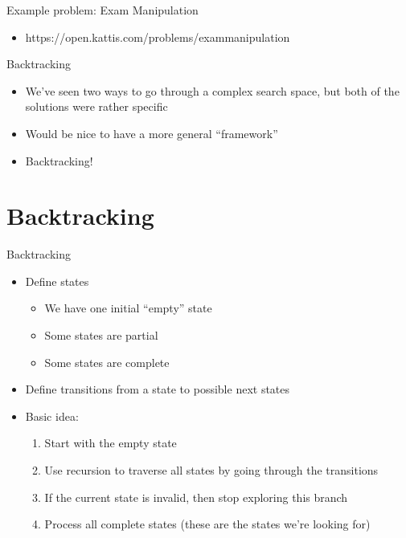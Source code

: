 \documentclass{beamer}
\begin{document}
\begin{frame}[plain]{Example problem: Exam Manipulation}
    \begin{itemize}
        \item https://open.kattis.com/problems/exammanipulation
    \end{itemize}
\end{frame}

\begin{frame}{Backtracking}
    \begin{itemize}
        \item We've seen two ways to go through a complex search space, but both of the solutions were rather specific
        \item Would be nice to have a more general ``framework''
        \vspace{10pt}
        \item Backtracking!
    \end{itemize}
\end{frame}

\section*{Backtracking}

\begin{frame}{Backtracking}
    \begin{itemize}
        \item Define states
            \begin{itemize}
                \item We have one initial ``empty'' state
                \item Some states are partial
                \item Some states are complete
            \end{itemize}
        \vspace{10pt}
        \item Define transitions from a state to possible next states
        \vspace{10pt}
        \item Basic idea:
            \begin{enumerate}
                \item Start with the empty state
                \item Use recursion to traverse all states by going through the transitions
                \item If the current state is invalid, then stop exploring this branch
                \item Process all complete states (these are the states we're looking for)
            \end{enumerate}
    \end{itemize}
\end{frame}
\end{document}
